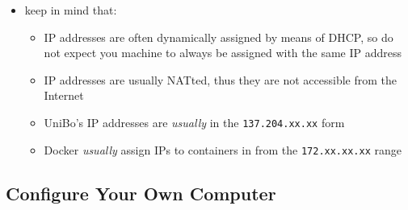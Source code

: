 \documentclass[handout]{beamer}\mode<presentation>{\usetheme{AMSCesenaPurpleAndGold}}
\begin{document}
\begin{frame}[allowframebreaks]
    \framebreak
    \begin{itemize}
    \item keep in mind that:
    \begin{itemize}
    	\item IP addresses are often dynamically assigned by means of DHCP, so \alert{do not expect} you machine to always be assigned with the same IP address
    	\item IP addresses are usually NATted, thus they are not accessible from the Internet
    	\item UniBo's IP addresses are \emph{usually} in the \texttt{137.204.xx.xx} form
    	\item Docker \emph{usually} assign IPs to containers in from the \texttt{172.xx.xx.xx} range
    \end{itemize}
	\end{itemize}

\end{frame}

\subsection{Configure Your Own Computer}
\end{document}
